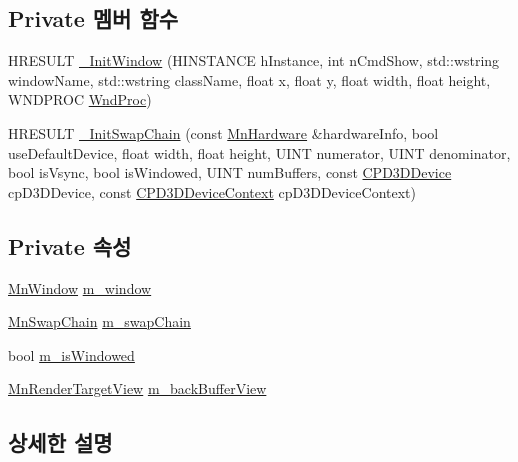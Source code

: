\subsection*{Private 멤버 함수}
\begin{DoxyCompactItemize}
\item 
H\+R\+E\+S\+U\+LT \hyperlink{class_m_n_l_1_1_mn_render_window_afb3f077d0738f9db3efe605597f88da8}{\+\_\+\+Init\+Window} (H\+I\+N\+S\+T\+A\+N\+CE h\+Instance, int n\+Cmd\+Show, std\+::wstring window\+Name, std\+::wstring class\+Name, float x, float y, float width, float height, W\+N\+D\+P\+R\+OC \hyperlink{main_8cpp_ac996a0edf7f6d6736f7f2920665a453d}{Wnd\+Proc})
\item 
H\+R\+E\+S\+U\+LT \hyperlink{class_m_n_l_1_1_mn_render_window_afbcafa43f1186347d52d332353f8e430}{\+\_\+\+Init\+Swap\+Chain} (const \hyperlink{class_m_n_l_1_1_mn_hardware}{Mn\+Hardware} \&hardware\+Info, bool use\+Default\+Device, float width, float height, U\+I\+NT numerator, U\+I\+NT denominator, bool is\+Vsync, bool is\+Windowed, U\+I\+NT num\+Buffers, const \hyperlink{namespace_m_n_l_a1eec210db8f309a4a9ac0d9658784c31}{C\+P\+D3\+D\+Device} cp\+D3\+D\+Device, const \hyperlink{namespace_m_n_l_aab3aabb6c9360e44ddc8b0bb563c2107}{C\+P\+D3\+D\+Device\+Context} cp\+D3\+D\+Device\+Context)
\end{DoxyCompactItemize}
\subsection*{Private 속성}
\begin{DoxyCompactItemize}
\item 
\hyperlink{class_m_n_l_1_1_mn_window}{Mn\+Window} \hyperlink{class_m_n_l_1_1_mn_render_window_a15bf07a3fc82d20ef185cf140b7c216e}{m\+\_\+window}
\item 
\hyperlink{class_m_n_l_1_1_mn_swap_chain}{Mn\+Swap\+Chain} \hyperlink{class_m_n_l_1_1_mn_render_window_a8092fe6c4b1069ddf24c07b440be73ca}{m\+\_\+swap\+Chain}
\item 
bool \hyperlink{class_m_n_l_1_1_mn_render_window_ad85d3339acf8e0b118b421754eb1266b}{m\+\_\+is\+Windowed}
\item 
\hyperlink{class_m_n_l_1_1_mn_render_target_view}{Mn\+Render\+Target\+View} \hyperlink{class_m_n_l_1_1_mn_render_window_a64924f5c12a756fd4be2991f812673a5}{m\+\_\+back\+Buffer\+View}
\end{DoxyCompactItemize}


\subsection{상세한 설명}


